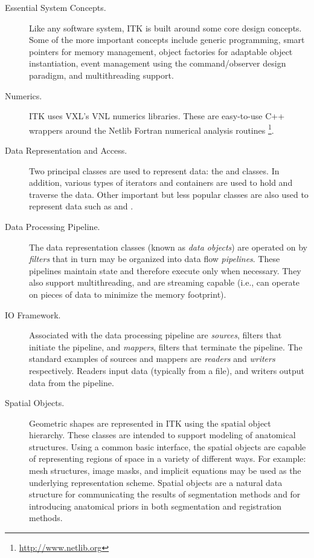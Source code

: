 \begin{description}
	\item[Essential System Concepts.] Like any software system, ITK is
        built around some core design concepts. Some of the more important
        concepts include generic programming, smart pointers for memory
        management, object factories for adaptable object instantiation,
        event management using the command/observer design paradigm, and
        multithreading support.

	\item[Numerics.] ITK uses VXL's VNL numerics libraries. These are
        easy-to-use C++ wrappers around the Netlib Fortran numerical
        analysis routines \footnote{\url{http://www.netlib.org}}.

	\item[Data Representation and Access.] Two principal classes are
        used to represent data: the  and 
        classes. In addition, various types of iterators and containers are
        used to hold and traverse the data. Other important but less popular
        classes are also used to represent data such as  and
        .

	\item[Data Processing Pipeline.] The data representation
	   classes (known as \emph{data objects}) are operated on by
	   \emph{filters} that in turn may be organized into data flow
	   \emph{pipelines}. These pipelines maintain state and therefore
	   execute only when necessary.  They also support
	   multithreading, and are streaming capable (i.e., can operate
	   on pieces of data to minimize the memory footprint).

    \item[IO Framework.] Associated with the data processing
        pipeline are \emph{sources}, filters that initiate the
        pipeline, and \emph{mappers}, filters that terminate the
        pipeline.  The standard examples of sources and mappers are
        \emph{readers} and \emph{writers} respectively. Readers
        input data (typically from a file), and writers output data
        from the pipeline.

	\item[Spatial Objects.] Geometric shapes are represented in ITK using
        the spatial object hierarchy. These classes are intended to support
        modeling of anatomical structures. Using a common basic interface,
        the spatial objects are capable of representing regions of space in a
        variety of different ways. For example: mesh structures, image masks,
        and implicit equations may be used as the underlying representation
        scheme. Spatial objects are a natural data structure for
        communicating the results of segmentation methods and for introducing
        anatomical priors in both segmentation and registration methods.


\end{description}
